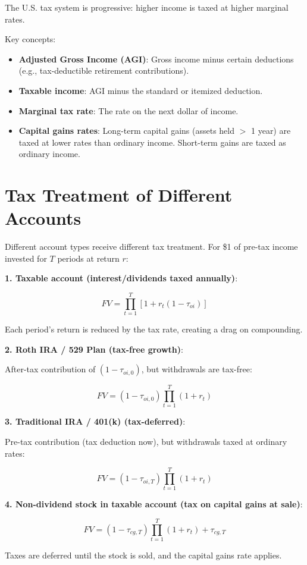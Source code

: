 \documentclass[11pt,letterpaper]{report}
\begin{document}
The U.S. tax system is progressive: higher income is taxed at higher marginal rates.

Key concepts:

\begin{itemize}
  \item \textbf{Adjusted Gross Income (AGI)}: Gross income minus certain deductions (e.g., tax-deductible retirement contributions).
  \item \textbf{Taxable income}: AGI minus the standard or itemized deduction.
  \item \textbf{Marginal tax rate}: The rate on the next dollar of income.
  \item \textbf{Capital gains rates}: Long-term capital gains (assets held $>$ 1 year) are taxed at lower rates than ordinary income.  Short-term gains are taxed as ordinary income.
\end{itemize}

\section{Tax Treatment of Different Accounts}


Different account types receive different tax treatment.  For \$1 of pre-tax income invested for $T$ periods at return $r$:

\textbf{1. Taxable account (interest/dividends taxed annually)}:

$$FV = \prod_{t=1}^{T} [1 + r_t(1 - \tau_{oi})]$$

Each period's return is reduced by the tax rate, creating a drag on compounding.

\textbf{2. Roth IRA / 529 Plan (tax-free growth)}:

After-tax contribution of $(1 - \tau_{oi,0})$, but withdrawals are tax-free:

$$FV = (1 - \tau_{oi,0}) \prod_{t=1}^{T} (1 + r_t)$$

\textbf{3. Traditional IRA / 401(k) (tax-deferred)}:

Pre-tax contribution (tax deduction now), but withdrawals taxed at ordinary rates:

$$FV = (1 - \tau_{oi,T}) \prod_{t=1}^{T} (1 + r_t)$$

\textbf{4. Non-dividend stock in taxable account (tax on capital gains at sale)}:

$$FV = (1 - \tau_{cg,T}) \prod_{t=1}^{T}(1 + r_t) + \tau_{cg,T}$$

Taxes are deferred until the stock is sold, and the capital gains rate applies.
\end{document}

